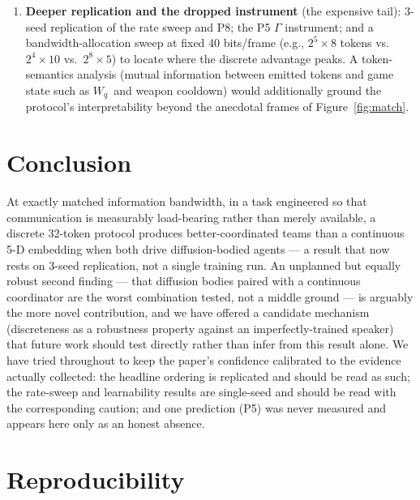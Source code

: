 \documentclass[11pt]{article}
\newcommand{\Wq}{\ensuremath{W_q}}
\begin{document}
\begin{enumerate}
  discreteness pays off by protecting the listener from an imperfect
  speaker, it should pay off \emph{more} when the listener's own state
  estimate is also noisy.
\item \textbf{Deeper replication and the dropped instrument} (the
  expensive tail): 3-seed replication of the rate sweep and P8; the P5
  $\Gamma$ instrument; and a bandwidth-allocation sweep at fixed 40
  bits/frame (e.g., $2^5 \times 8$ tokens vs.\ $2^4 \times 10$ vs.\
  $2^8 \times 5$) to locate where the discrete advantage peaks. A
  token-semantics analysis (mutual information between emitted tokens
  and game state such as \Wq\ and weapon cooldown) would additionally
  ground the protocol's interpretability beyond the anecdotal frames of
  Figure~\ref{fig:match}.
\end{enumerate}

\section{Conclusion}

At exactly matched information bandwidth, in a task engineered so that
communication is measurably load-bearing rather than merely available,
a discrete 32-token protocol produces better-coordinated teams than a
continuous 5-D embedding when both drive diffusion-bodied agents --- a
result that now rests on 3-seed replication, not a single training run.
An unplanned but equally robust second finding --- that diffusion
bodies paired with a continuous coordinator are the worst combination
tested, not a middle ground --- is arguably the more novel
contribution, and we have offered a candidate mechanism (discreteness
as a robustness property against an imperfectly-trained speaker) that
future work should test directly rather than infer from this result
alone. We have tried throughout to keep the paper's confidence
calibrated to the evidence actually collected: the headline ordering is
replicated and should be read as such; the rate-sweep and learnability
results are single-seed and should be read with the corresponding
caution; and one prediction (P5) was never measured and appears here
only as an honest absence.

\section*{Reproducibility}
\end{document}
